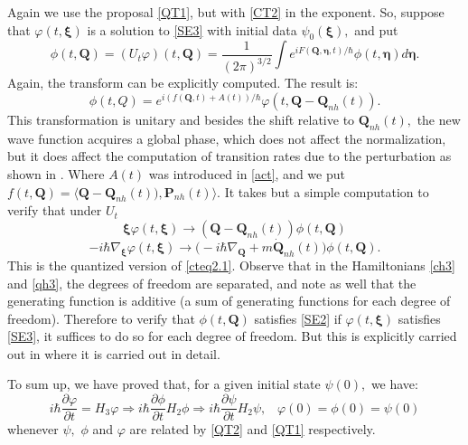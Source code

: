 \documentclass[12pt]{article}
\numberwithin{equation}{section}
\newcommand{\bxi}{{\boldsymbol \xi}}
\newcommand{\bet}{{\boldsymbol \eta}}
\def\bP{{\boldsymbol P}}
\def\bQ{{\boldsymbol Q}}
\begin{document}
Again we use the proposal \eqref{QT1}, but with \eqref{CT2} in the exponent. So, suppose that $\varphi(t,\bxi)$ is a solution to \eqref{SE3} with initial data $\psi_0(\bxi),$ and put
\begin{equation}\label{QT2}
\phi(t,\bQ) = ( U_t\varphi)(t,\bQ) = \frac{1}{(2\pi)^{3/2}} \int e^{iF(\bQ,\bet,t)/\hbar}\phi(t,\bet)d\bet.
\end{equation}
Again, the transform can be explicitly computed. The result is:
\begin{equation}\label{QT2.1}
\phi(t,Q) = e^{i(f(\bQ,t) + A(t))/\hbar}\varphi(t, \bQ-\bQ_{nh}(t)).
\end{equation}
This transformation is unitary and besides the shift relative to $\bQ_{nh}(t),$ the new wave function acquires a global phase, which does not affect the normalization, but it does affect the computation of transition rates due to the perturbation as shown in \cite{Gz2}.
Where $A(t)$ was introduced in \eqref{act}, and we put $f(t,\bQ)=\langle\bQ-\bQ_{nh}(t)),\bP_{nh}(t)\rangle.$ It takes but a simple computation to verify that under $U_t$
$$\bxi\varphi(t,\bxi) \rightarrow (\bQ-\bQ_{nh}(t))\phi(t,\bQ)$$
$$-i\hbar\nabla_{\bxi}\varphi(t,\bxi) \rightarrow \big(-i\hbar\nabla_{\bQ}  + m\dot{\bQ}_{nh}(t)\big)\phi(t,\bQ).$$ 
This is the quantized version of \eqref{cteq2.1}. Observe that in the Hamiltonians \eqref{ch3} and \eqref{qh3}, the degrees of freedom are separated, and note as well that the generating function is additive (a sum of generating functions for each degree of freedom). Therefore to verify that $\phi(t,\bQ)$ satisfies \eqref{SE2} if $\varphi(t,\bxi)$ satisfies \eqref{SE3}, it suffices to do so for each degree of freedom. But this is explicitly carried out in \cite{Gz2} where it is carried out in detail.

To sum up, we have proved that, for a given initial state $\psi(0),$ we have: 
\begin{equation}
i\hbar\frac{\partial \varphi}{\partial t} = H_3\varphi \Longrightarrow i\hbar\frac{\partial \phi}{\partial t}H_2\phi \Longrightarrow i\hbar\frac{\partial \psi}{\partial t}H_2\psi, \;\;\;\varphi(0)=\phi(0)=\psi(0)
\end{equation}
whenever $\psi,$ $\phi$ and $\varphi$ are related by \eqref{QT2} and \eqref{QT1} respectively.
\end{document}
